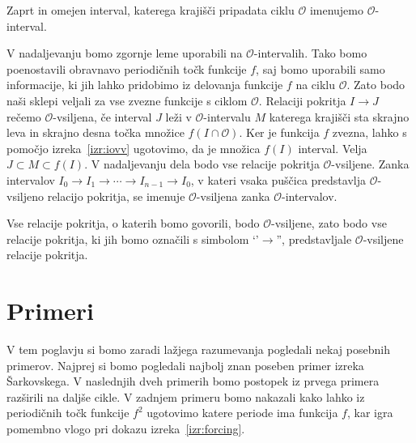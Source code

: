 \documentclass[mat2]{fmfdelo}
\begin{document}
\begin{definicija}
Zaprt in omejen interval, katerega krajišči pripadata ciklu $\mathcal{O}$ imenujemo $\mathcal{O}$-interval. 
\end{definicija}
V nadaljevanju bomo zgornje leme uporabili na $\mathcal{O}$-intervalih. Tako bomo poenostavili obravnavo periodičnih točk funkcije $f$, saj bomo uporabili samo informacije, ki jih lahko pridobimo iz delovanja funkcije $f$ na ciklu $\mathcal{O}$. Zato bodo naši sklepi veljali za vse zvezne funkcije s ciklom $\mathcal{O}$. Relaciji pokritja $I \to J$ rečemo $\mathcal{O}$-vsiljena, če interval $J$ leži v $\mathcal{O}$-intervalu $M$ katerega krajišči sta skrajno leva in skrajno desna točka množice $f(I \cap \mathcal{O})$. Ker je funkcija $f$ zvezna, lahko s pomočjo izreka~\ref{izr:iovv} ugotovimo, da je množica $f(I)$ interval. Velja $J \subset M \subset f(I)$. V nadaljevanju dela bodo vse relacije pokritja $\mathcal{O}$-vsiljene. Zanka intervalov $I_0 \to I_1 \to \cdots \to I_{n-1} \to I_0$, v kateri vsaka puščica predstavlja $\mathcal{O}$-vsiljeno relacijo pokritja, se imenuje $\mathcal{O}$-vsiljena zanka $\mathcal{O}$-intervalov.

Vse relacije pokritja, o katerih bomo govorili, bodo $\mathcal{O}$-vsiljene, zato bodo vse relacije pokritja, ki jih bomo označili s simbolom `'$\to$'', predstavljale $\mathcal{O}$-vsiljene relacije pokritja.


\section{Primeri}%
V tem poglavju si bomo zaradi lažjega razumevanja pogledali nekaj posebnih primerov. Najprej si bomo pogledali najbolj znan poseben primer izreka Šarkovskega. V naslednjih dveh primerih bomo postopek iz prvega primera razširili na daljše cikle. V zadnjem primeru bomo nakazali kako lahko iz periodičnih točk funkcije $f^2$ ugotovimo katere periode ima funkcija $f$, kar igra pomembno vlogo pri dokazu izreka~\ref{izr:forcing}.
\end{document}
